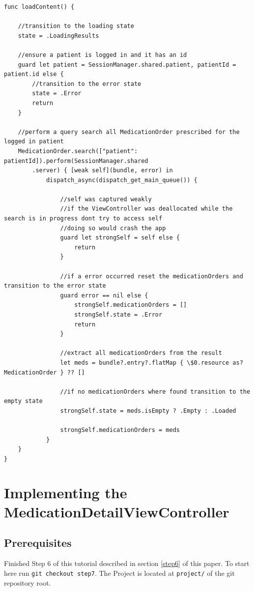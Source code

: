 \documentclass{article}
\begin{document}
\begin{verbatim}
func loadContent() {

    //transition to the loading state
    state = .LoadingResults

    //ensure a patient is logged in and it has an id
    guard let patient = SessionManager.shared.patient, patientId = patient.id else {
        //transition to the error state
        state = .Error
        return
    }

    //perform a query search all MedicationOrder prescribed for the logged in patient
    MedicationOrder.search(["patient": patientId]).perform(SessionManager.shared
        .server) { [weak self](bundle, error) in
            dispatch_async(dispatch_get_main_queue()) {

                //self was captured weakly
                //if the ViewController was deallocated while the search is in progress dont try to access self
                //doing so would crash the app
                guard let strongSelf = self else {
                    return
                }

                //if a error occurred reset the medicationOrders and transition to the error state
                guard error == nil else {
                    strongSelf.medicationOrders = []
                    strongSelf.state = .Error
                    return
                }

                //extract all medicationOrders from the result
                let meds = bundle?.entry?.flatMap { \$0.resource as? MedicationOrder } ?? []

                //if no medicationOrders where found transition to the empty state
                strongSelf.state = meds.isEmpty ? .Empty : .Loaded

                strongSelf.medicationOrders = meds
            }
    }
}
\end{verbatim}

\section{Implementing the MedicationDetailViewController}\label{step-7---implementing-medicationdetailviewcontroller}

\subsection{Prerequisites}\label{step7:prerequisites}
Finished Step 6 of this tutorial described in section \ref{step6} of this paper.
To start here run \texttt{git checkout step7}.
The Project is located at \texttt{project/} of the git repository root.
\end{document}
